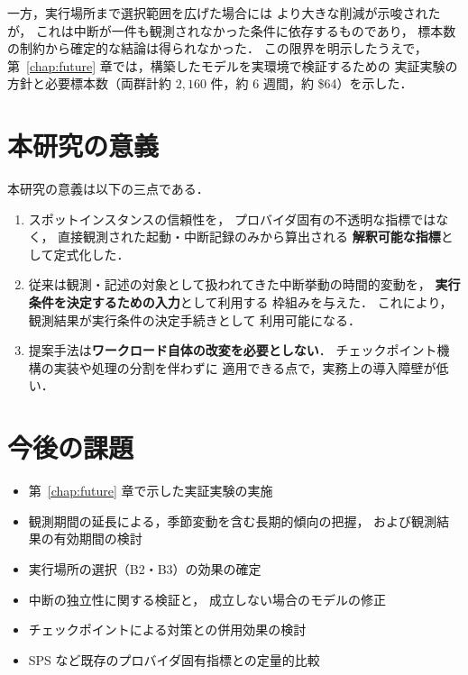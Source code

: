 \documentclass[11pt,a4paper]{ltjsreport}
\begin{document}
一方，実行場所まで選択範囲を広げた場合には
より大きな削減が示唆されたが，
これは中断が一件も観測されなかった条件に依存するものであり，
標本数の制約から確定的な結論は得られなかった．
この限界を明示したうえで，
第~\ref{chap:future} 章では，構築したモデルを実環境で検証するための
実証実験の方針と必要標本数（両群計約 $2{,}160$ 件，約 6 週間，約 \$64）を示した．

\section{本研究の意義}

本研究の意義は以下の三点である．

\begin{enumerate}
  \item スポットインスタンスの信頼性を，
        プロバイダ固有の不透明な指標ではなく，
        直接観測された起動・中断記録のみから算出される
        \textbf{解釈可能な指標}として定式化した．
  \item 従来は観測・記述の対象として扱われてきた中断挙動の時間的変動を，
        \textbf{実行条件を決定するための入力}として利用する
        枠組みを与えた．
        これにより，観測結果が実行条件の決定手続きとして
        利用可能になる．
  \item 提案手法は\textbf{ワークロード自体の改変を必要としない}．
        チェックポイント機構の実装や処理の分割を伴わずに
        適用できる点で，実務上の導入障壁が低い．
\end{enumerate}

\section{今後の課題}

\begin{itemize}
  \item 第~\ref{chap:future} 章で示した実証実験の実施
  \item 観測期間の延長による，季節変動を含む長期的傾向の把握，
        および観測結果の有効期間の検討
  \item 実行場所の選択（B2・B3）の効果の確定
  \item 中断の独立性に関する検証と，
        成立しない場合のモデルの修正
  \item チェックポイントによる対策との併用効果の検討
  \item SPS など既存のプロバイダ固有指標との定量的比較
\end{itemize}

\end{document}
